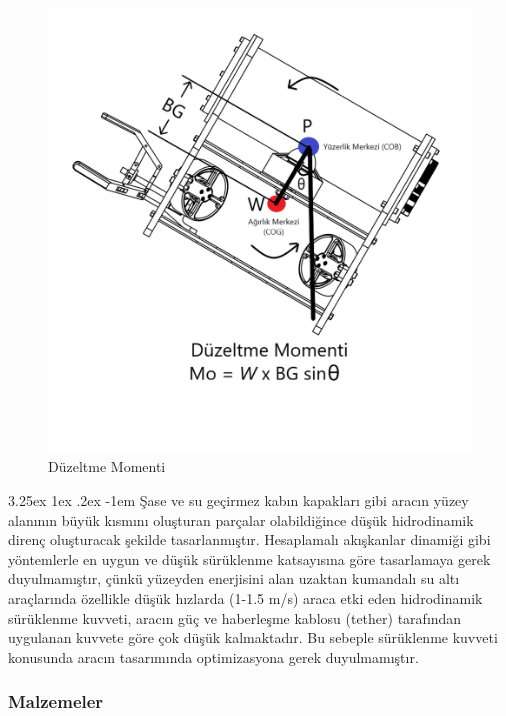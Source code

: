 \documentclass[12pt]{article}
\makeatletter
\renewcommand\paragraph{\@startsection{paragraph}{5}{\z@}%
  {3.25ex \@plus1ex \@minus.2ex}%
  {-1em}%
  {\normalfont\normalsize\bfseries}}
\makeatother
\begin{document}
\begin{figure}[hbt!]
\centering
 \begin{adjustbox}{width=10cm}
\includegraphics[width=1\textwidth]{images/moment.png}
 \end{adjustbox}
\caption{Düzeltme Momenti}
\label{fig:moment}
\end{figure}

\paragraph{}Şase ve su geçirmez kabın kapakları gibi aracın yüzey alanının büyük kısmını oluşturan parçalar olabildiğince düşük hidrodinamik direnç oluşturacak şekilde tasarlanmıştır. Hesaplamalı akışkanlar dinamiği gibi yöntemlerle en uygun ve düşük sürüklenme katsayısına göre tasarlamaya gerek duyulmamıştır, çünkü yüzeyden enerjisini alan uzaktan kumandalı su altı araçlarında özellikle düşük hızlarda (1-1.5 m/s) araca etki eden hidrodinamik sürüklenme kuvveti, aracın güç ve haberleşme kablosu (tether) tarafından uygulanan kuvvete göre çok düşük kalmaktadır.\cite{BOOK:rovmanual} Bu sebeple sürüklenme kuvveti konusunda aracın tasarımında optimizasyona gerek duyulmamıştır.

\subsubsection{Malzemeler}
\end{document}
